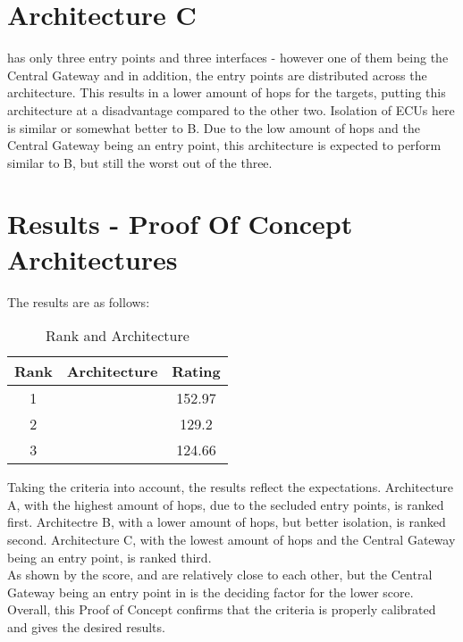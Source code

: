 \section{Architecture C}
\label{sec:archc}

 has only three entry points and three interfaces - however one of them being the Central Gateway and 
in addition, the entry points are distributed across the architecture. 
This results in a lower amount of hops for the targets, putting this architecture at a disadvantage compared to the other two.
Isolation of ECUs here is similar or somewhat better to B.
Due to the low amount of hops and the Central Gateway being an entry point, this architecture is expected to perform 
similar to B, but still the worst out of the three.


\section{Results - Proof Of Concept Architectures}
\label{sec:resultsproof}

The results are as follows:

\begin{table}[h]
    \label{table:survey}
    \centering
    \caption{Rank and Architecture}
    \begin{tabular}{ |c|c|c| } 
    \hline
    Rank & Architecture & Rating\\
    \hline
    1 & \nameref{fig:architectureA} & 152.97\\ 
    2 & \nameref{fig:architectureB} & 129.2\\
    3 & \nameref{fig:architectureC} & 124.66\\
    \hline
    \end{tabular}
\end{table}

Taking the criteria into account, the results reflect the expectations.
Architecture A, with the highest amount of hops, due to the secluded entry points, is ranked first.
Architectre B, with a lower amount of hops, but better isolation, is ranked second.
Architecture C, with the lowest amount of hops and the Central Gateway being an entry point, is ranked third.\\

As shown by the score,  and  are relatively close to each other,
but the Central Gateway being an entry point in  is the deciding factor for the lower score.\\

Overall, this Proof of Concept confirms that the criteria is properly calibrated and gives the desired results.